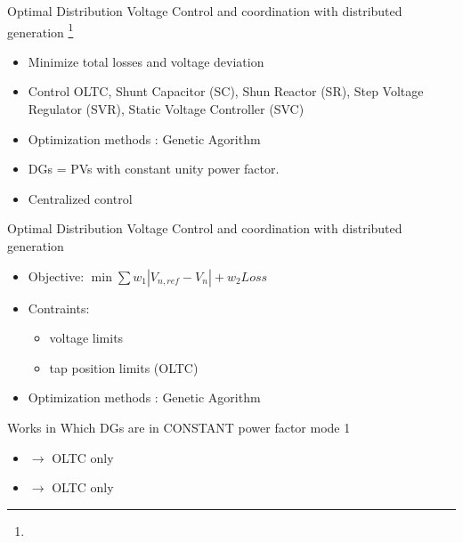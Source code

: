 \documentclass[10pt]{beamer}
\begin{document}
\begin{frame} {Optimal Distribution Voltage Control and coordination with distributed generation \footnote{}}
\begin{itemize}
\item Minimize total losses and voltage deviation
\item Control OLTC, Shunt Capacitor (SC), Shun Reactor (SR), Step Voltage Regulator (SVR), Static Voltage Controller (SVC)
\item Optimization methods : Genetic Agorithm
\item DGs = PVs with constant unity power factor.

\item Centralized control
\end{itemize}
\end{frame}

\begin{frame} {Optimal Distribution Voltage Control and coordination with distributed generation}
\begin{itemize}
\item Objective: $\min \sum w_1 |V_{n,ref} -V_n|+w_2Loss$
\item Contraints:
    \begin{itemize}
       \item voltage limits
       \item tap position limits (OLTC)
    \end{itemize}
\item Optimization methods : Genetic Agorithm
\end{itemize}
\end{frame}

%
%

\begin{frame} {Works in Which DGs are in CONSTANT power factor mode 1}
\begin{itemize}
\item {} $\rightarrow$ OLTC only
\item {} $\rightarrow$ OLTC only
\end{itemize}
\end{frame}
\end{document}
